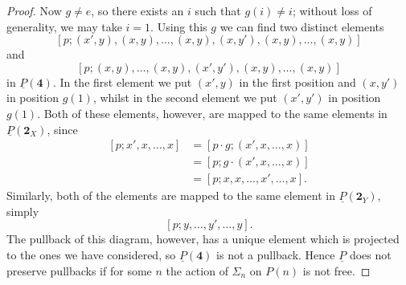 \documentclass{amsbook} %
\newcommand{\mb}{\mathbf}
\numberwithin{section}{chapter}
\begin{document}
\begin{proof}
Now $g \neq e$, so there exists an $i$ such that $g(i) \neq i$; without loss of generality, we may take $i=1$. Using this $g$ we can find two distinct elements
    \[
        \left[p;(x',y),(x,y),\ldots,(x,y),(x,y'),(x,y),\ldots,(x,y)\right]
    \]
and
    \[
        \left[p;(x,y),\ldots,(x,y),(x',y'),(x,y),\ldots,(x,y)\right]
    \]
in $\underline{P}(\mb{4})$.  In the first element we put $(x',y)$ in the first position and $(x,y')$ in position $g(1)$, whilst in the second element we put $(x',y')$ in position $g(1)$. Both of these elements, however, are mapped to the same elements in $\underline{P}(\mb{2}_X)$, since
    \begin{align*}
           \left[p; x', x, \ldots, x\right]&= \left[p \cdot g; (x', x, \ldots, x)\right]\\
          &= \left[p;g\cdot (x', x, \ldots, x)\right]\\
          &= \left[p;x,x,\ldots,x',\ldots,x\right].
    \end{align*}
Similarly, both of the elements are mapped to the same element in $\underline{P}(\mathbf{2}_Y)$, simply
    \[
        \left[p;y,\ldots,y', \ldots, y\right].
    \]
The pullback of this diagram, however, has a unique element which is projected to the ones we have considered, so $\underline{P}(\mb{4})$ is not a pullback. Hence $\underline{P}$ does not preserve pullbacks if for some $n$ the action of $\Sigma_n$ on $P(n)$ is not free.


\end{proof}
\end{document}
